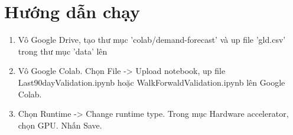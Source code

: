 \chapter{Hướng dẫn chạy}
\label{sec:contribute}
\begin{enumerate}
    \item Vô Google Drive, tạo thư mục 'colab/demand-forecast' và up file 'gld.csv' trong thư mục 'data' lên
    \begin{figure}[h]
    \end{figure}
    \item Vô Google Colab. Chọn File -> Upload notebook, up file Last90dayValidation.ipynb hoặc WalkForwaldValidation.ipynb lên Google Colab.
    \begin{figure}[h]
    \end{figure}
    \item Chọn Runtime -> Change runtime type. Trong mục Hardware accelerator, chọn GPU. Nhấn Save. 
    \begin{figure}[!h]
\end{figure}
\end{enumerate}
